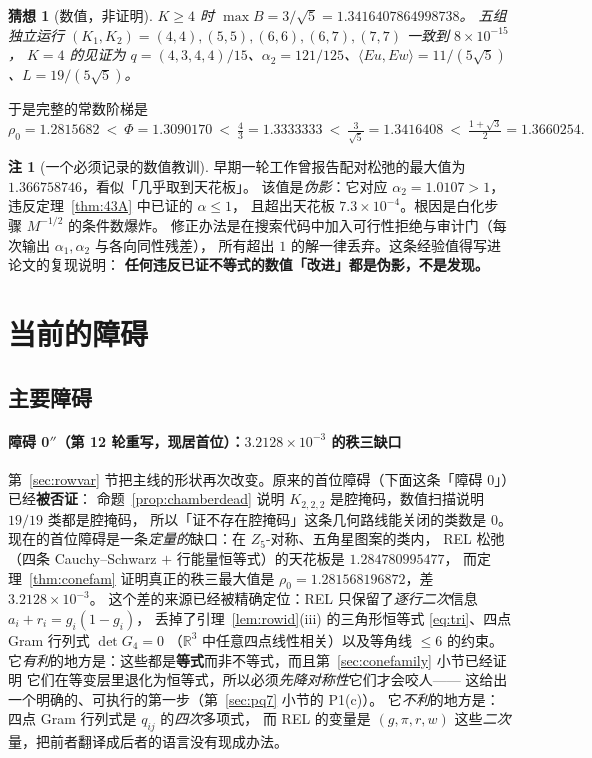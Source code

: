 \documentclass[UTF8,11pt]{ctexart}
\newtheorem{conjecture}[theorem]{猜想}
\theoremstyle{definition}
\newtheorem{remark}[theorem]{注}
\newcommand{\R}{\mathbb{R}}
\begin{document}
\begin{conjecture}[数值，非证明]
$K\ge4$ 时 $\max B=3/\sqrt5=1.3416407864998738$。
五组独立运行 $(K_1,K_2)=(4,4),(5,5),(6,6),(6,7),(7,7)$ 一致到 $8\times10^{-15}$，
$K=4$ 的见证为 $q=(4,3,4,4)/15$、$\alpha_2=121/125$、$\langle Eu,Ew\rangle=11/(5\sqrt5)$、$L=19/(5\sqrt5)$。
\end{conjecture}

于是完整的常数阶梯是
\[
\rho_0=1.2815682\ <\ \Phi=1.3090170\ <\ \tfrac43=1.3333333\ <\ \tfrac3{\sqrt5}=1.3416408\ <\ \tfrac{1+\sqrt3}2=1.3660254 .
\]

\begin{remark}[一个必须记录的数值教训]
早期一轮工作曾报告配对松弛的最大值为 $1.366758746$，看似「几乎取到天花板」。
该值是\emph{伪影}：它对应 $\alpha_2=1.0107>1$，违反定理~\ref{thm:43A} 中已证的 $\alpha\le1$，
且超出天花板 $7.3\times10^{-4}$。根因是白化步骤 $M^{-1/2}$ 的条件数爆炸。
修正办法是在搜索代码中加入可行性拒绝与审计门（每次输出 $\alpha_1,\alpha_2$ 与各向同性残差），
所有超出 $1$ 的解一律丢弃。这条经验值得写进论文的复现说明：
\textbf{任何违反已证不等式的数值「改进」都是伪影，不是发现。}
\end{remark}

\section{当前的障碍}\label{sec:obstacles}

\subsection{主要障碍}

\paragraph{障碍 0$''$（第 12 轮重写，现居首位）：$3.2128\times10^{-3}$ 的秩三缺口}
第~\ref{sec:rowvar} 节把主线的形状再次改变。原来的首位障碍（下面这条「障碍 0」）已经\textbf{被否证}：
命题~\ref{prop:chamberdead} 说明 $K_{2,2,2}$ 是腔掩码，数值扫描说明 $19/19$ 类都是腔掩码，
所以「证不存在腔掩码」这条几何路线能关闭的类数是 $0$。
现在的首位障碍是一条\emph{定量的}缺口：在 $Z_5$-对称、五角星图案的类内，
REL 松弛（四条 Cauchy--Schwarz $+$ 行能量恒等式）的天花板是 $1.284780995477$，
而定理~\ref{thm:conefam} 证明真正的秩三最大值是 $\rho_0=1.281568196872$，差 $3.2128\times10^{-3}$。
这个差的来源已经被精确定位：REL 只保留了\emph{逐行二次}信息 $a_i+r_i=g_i(1-g_i)$，
丢掉了引理~\ref{lem:rowid}(iii) 的三角形恒等式 \eqref{eq:tri}、四点 Gram 行列式 $\det G_4=0$
（$\R^3$ 中任意四点线性相关）以及等角线 $\le6$ 的约束。
它\emph{有利}的地方是：这些都是\textbf{等式}而非不等式，而且第~\ref{sec:conefamily} 小节已经证明
它们在等变层里退化为恒等式，所以必须\emph{先降对称性}它们才会咬人——
这给出一个明确的、可执行的第一步（第~\ref{sec:pq7} 小节的 P1(c)）。
它\emph{不利}的地方是：四点 Gram 行列式是 $q_{ij}$ 的\emph{四次}多项式，
而 REL 的变量是 $(g,\pi,r,w)$ 这些\emph{二次}量，把前者翻译成后者的语言没有现成办法。
\end{document}
